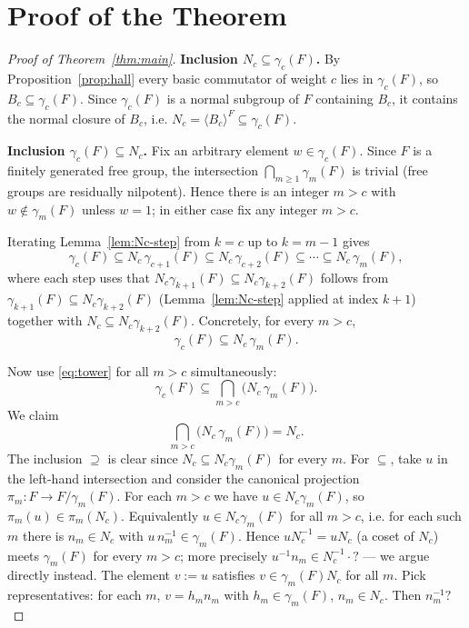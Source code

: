 \documentclass{amsart}
\theoremstyle{definition}
\theoremstyle{remark}
\begin{document}
\section{Proof of the Theorem}\label{sec:proof}

\begin{proof}[Proof of Theorem~\ref{thm:main}]
\textbf{Inclusion $N_c\subseteq\gamma_c(F)$.}
By Proposition~\ref{prop:hall} every basic commutator of weight $c$ lies in
$\gamma_c(F)$, so $B_c\subseteq\gamma_c(F)$. Since $\gamma_c(F)$ is a normal
subgroup of $F$ containing $B_c$, it contains the normal closure of $B_c$, i.e.
$N_c=\langle B_c\rangle^{F}\subseteq\gamma_c(F)$.

\textbf{Inclusion $\gamma_c(F)\subseteq N_c$.}
Fix an arbitrary element $w\in\gamma_c(F)$. Since $F$ is a finitely generated free
group, the intersection $\bigcap_{m\ge 1}\gamma_m(F)$ is trivial (free groups are
residually nilpotent). Hence there is an integer $m>c$ with
$w\notin\gamma_{m}(F)$ unless $w=1$; in either case fix any integer $m>c$.

Iterating Lemma~\ref{lem:Nc-step} from $k=c$ up to $k=m-1$ gives
\[
\gamma_c(F)\subseteq N_c\,\gamma_{c+1}(F)\subseteq N_c\,\gamma_{c+2}(F)
\subseteq\cdots\subseteq N_c\,\gamma_{m}(F),
\]
where each step uses that $N_c\gamma_{k+1}(F)\subseteq N_c\gamma_{k+2}(F)$ follows
from $\gamma_{k+1}(F)\subseteq N_c\gamma_{k+2}(F)$ (Lemma~\ref{lem:Nc-step} applied
at index $k+1$) together with $N_c\subseteq N_c\gamma_{k+2}(F)$. Concretely, for
every $m>c$,
\begin{equation}\label{eq:tower}
\gamma_c(F)\subseteq N_c\,\gamma_{m}(F).
\end{equation}

Now use \eqref{eq:tower} for all $m>c$ simultaneously:
\[
\gamma_c(F)\subseteq\bigcap_{m>c}\big(N_c\,\gamma_m(F)\big).
\]
We claim
\begin{equation}\label{eq:intersection}
\bigcap_{m>c}\big(N_c\,\gamma_m(F)\big)=N_c .
\end{equation}
The inclusion $\supseteq$ is clear since $N_c\subseteq N_c\gamma_m(F)$ for every
$m$. For $\subseteq$, take $u$ in the left-hand intersection and consider the
canonical projection $\pi_m\colon F\to F/\gamma_m(F)$. For each $m>c$ we have
$u\in N_c\gamma_m(F)$, so $\pi_m(u)\in\pi_m(N_c)$. Equivalently $u\in N_c\gamma_m(F)$
for all $m>c$, i.e. for each such $m$ there is $n_m\in N_c$ with
$u\,n_m^{-1}\in\gamma_m(F)$. Hence $u N_c^{-1}=u N_c$ (a coset of $N_c$) meets
$\gamma_m(F)$ for every $m>c$; more precisely $u^{-1}n_m\in N_c^{-1}\cdot? $ — we
argue directly instead. The element $v:=u$ satisfies $v\in\gamma_m(F)N_c$ for all
$m$. Pick representatives: for each $m$, $v=h_m n_m$ with $h_m\in\gamma_m(F)$,
$n_m\in N_c$. Then $n_m^{-1}? $


\end{proof}
\end{document}
